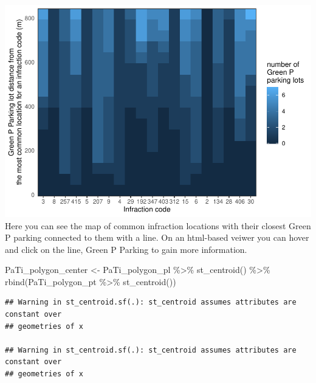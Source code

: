 \documentclass[
]{article}
\newenvironment{Shaded}{\begin{snugshade}}{\end{snugshade}}
\newcommand{\FunctionTok}[1]{\textcolor[rgb]{0.00,0.00,0.00}{#1}}
\newcommand{\NormalTok}[1]{#1}
\newcommand{\OtherTok}[1]{\textcolor[rgb]{0.56,0.35,0.01}{#1}}
\newcommand{\SpecialCharTok}[1]{\textcolor[rgb]{0.00,0.00,0.00}{#1}}
\begin{document}
\includegraphics{main_1_files/figure-latex/Green P tile-1.pdf} Here you
can see the map of common infraction locations with their closest Green
P parking connected to them with a line. On an html-based veiwer you can
hover and click on the line, Green P Parking to gain more information.

\begin{Shaded}
\begin{Highlighting}[]
\NormalTok{PaTi\_polygon\_center }\OtherTok{\textless{}{-}}\NormalTok{ PaTi\_polygon\_pl }\SpecialCharTok{\%\textgreater{}\%} \FunctionTok{st\_centroid}\NormalTok{() }\SpecialCharTok{\%\textgreater{}\%} \FunctionTok{rbind}\NormalTok{(PaTi\_polygon\_pt }\SpecialCharTok{\%\textgreater{}\%} \FunctionTok{st\_centroid}\NormalTok{())}
\end{Highlighting}
\end{Shaded}

\begin{verbatim}
## Warning in st_centroid.sf(.): st_centroid assumes attributes are constant over
## geometries of x

## Warning in st_centroid.sf(.): st_centroid assumes attributes are constant over
## geometries of x
\end{verbatim}
\end{document}
